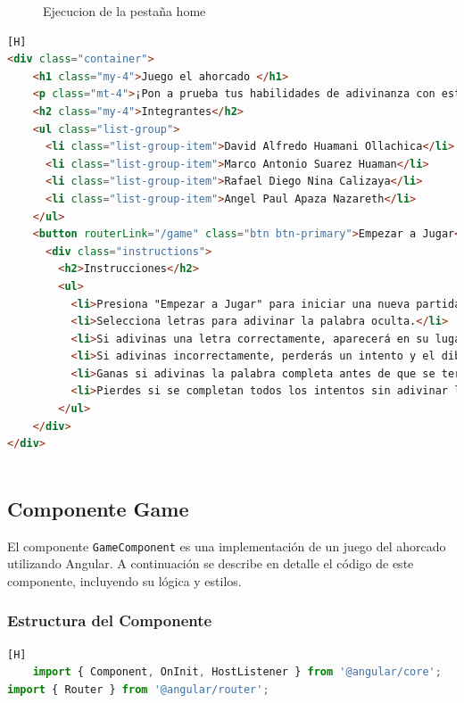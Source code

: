\documentclass{article}
\begin{document}
\begin{itemize}
\begin{figure}[h]
                \caption{Ejecucion de la pestaña home}
                \label{fig:modelo_bd}
            \end{figure}
    \begin{lstlisting}[language=html,caption={src\app\components\home\home.component.html}][H]
<div class="container">
    <h1 class="my-4">Juego el ahorcado </h1>
    <p class="mt-4">¡Pon a prueba tus habilidades de adivinanza con este entretenido juego de palabras!</p>
    <h2 class="my-4">Integrantes</h2>
    <ul class="list-group">
      <li class="list-group-item">David Alfredo Huamani Ollachica</li>
      <li class="list-group-item">Marco Antonio Suarez Huaman</li>
      <li class="list-group-item">Rafael Diego Nina Calizaya</li>
      <li class="list-group-item">Angel Paul Apaza Nazareth</li>
    </ul>
    <button routerLink="/game" class="btn btn-primary">Empezar a Jugar</button>
      <div class="instructions">
        <h2>Instrucciones</h2>
        <ul>
          <li>Presiona "Empezar a Jugar" para iniciar una nueva partida.</li>
          <li>Selecciona letras para adivinar la palabra oculta.</li>
          <li>Si adivinas una letra correctamente, aparecerá en su lugar en la palabra.</li>
          <li>Si adivinas incorrectamente, perderás un intento y el dibujo del ahorcado se completará un poco más.</li>
          <li>Ganas si adivinas la palabra completa antes de que se terminen los intentos.</li>
          <li>Pierdes si se completan todos los intentos sin adivinar la palabra.</li>
        </ul>
    </div>
</div>



    \end{lstlisting}


\subsection{Componente Game}

El componente \texttt{GameComponent} es una implementación de un juego del ahorcado utilizando Angular. A continuación se describe en detalle el código de este componente, incluyendo su lógica y estilos.

\subsubsection{Estructura del Componente}

    \begin{lstlisting}[language=js,caption ={src\app\components\game\game.component.ts}][H]
    import { Component, OnInit, HostListener } from '@angular/core';
import { Router } from '@angular/router';


\end{lstlisting}
\end{itemize}
\end{document}

